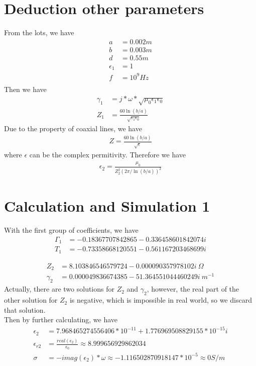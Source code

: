 \documentclass{article}
\begin{document}
\section{Deduction other parameters}
From the lots, we have
\begin{align*}
    a &= 0.002m\\
    b &= 0.003m\\
    d &= 0.55m\\
    \epsilon_1 &= 1\\
    f &= 10^9Hz\\
\end{align*}
Then we have
\begin{align*}
    \gamma_1 &= j*\omega*\sqrt{\mu_0\epsilon_1\epsilon_0}\\
    Z_1 &= \frac{60\ln(b/a)}{\sqrt{\epsilon_1\epsilon_0}}
\end{align*}
Due to the property of coaxial lines, we have
\begin{align*}
    Z = \frac{60\ln(b/a)}{\sqrt{\epsilon}}
\end{align*}
where $\epsilon$ can be the complex permitivity. Therefore we have
\begin{align*}
    \epsilon_2 = \frac{\mu_0}{Z_2^2(2\pi/\ln(b/a))^2}
\end{align*}

\section{Calculation and Simulation 1}
With the first group of coefficients, we have
\begin{align*}
    \Gamma_1 &= -0.18367707842865-0.336458601842074i\\
    T_1 &= -0.73358668120551-0.561167203468699i
\end{align*}

\begin{align*}
    Z_2 &=     8.103846546579724 - 0.000090357978102i\ \Omega \\
    \gamma_2 &=  0.000049836674385 -51.364551044460249i\ m^{-1}
\end{align*}
Actually, there are two solutions for $Z_2$ and $\gamma_2$, however, the real part of the other solution for $Z_2$ is negative,
which is impossible in real world, so we discard that solution.\\

Then by further calculating, we have
\begin{align*}
    \epsilon_2 &=  7.968465274556406*10^{-11} + 1.776969508829155*10^{-15}i\\
    \epsilon_{r2} &= \frac{real(\epsilon_2)}{\epsilon_0}\approx 8.999656929862034\\
    \sigma &= -imag(\epsilon_2)*\omega \approx -1.116502870918147*10^{-5} \approx 0 S/m
\end{align*}
\end{document}
